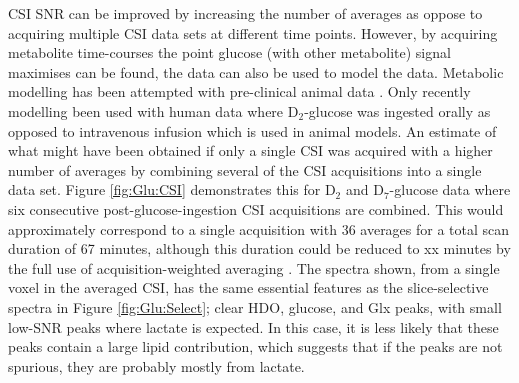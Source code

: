 \documentclass[class=article, crop=false]{standalone}
\begin{document}
CSI SNR can be improved by increasing the number of averages as oppose to acquiring multiple CSI data sets at different time points. However, by acquiring metabolite time-courses the point glucose (with other metabolite) signal maximises can be found, the data can also be used to model the data. Metabolic modelling has been attempted with pre-clinical animal data \cite{Lu2017QuantitativeSpectroscopy, Rich20201HVivo, Kreis2020MeasuringMRI, Simoes2022GlucoseGlioblastoma}. Only recently modelling been used with human data where D$_2$-glucose was ingested orally \cite{Ruhm2022Dynamic9.4T} as opposed to intravenous infusion which is used in animal models. An estimate of what might have been obtained if only a single CSI was acquired with a higher number of averages by combining several of the CSI acquisitions into a single data set. Figure \ref{fig:Glu:CSI} demonstrates this for D$_2$ and D$_7$-glucose data where six consecutive post-glucose-ingestion CSI acquisitions are combined. This would approximately correspond to a single acquisition with 36 averages for a total scan duration of 67 minutes, although this duration could be reduced to xx minutes by the full use of acquisition-weighted averaging \cite{Pohmann2001AccurateCSI}. The spectra shown, from a single voxel in the averaged CSI, has the same essential features as the slice-selective spectra in Figure \ref{fig:Glu:Select}; clear HDO, glucose, and Glx peaks, with small low-SNR peaks where lactate is expected. In this case, it is less likely that these peaks contain a large lipid contribution, which suggests that if the peaks are not spurious, they are probably mostly from lactate. 

\end{document}
